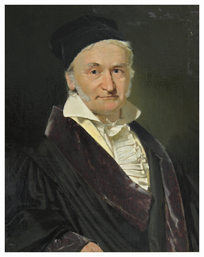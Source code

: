 \documentclass[]{article}
\begin{document}
\begin{figure}
  \centering
    \begin{subfigure}[t]{0.49\textwidth}
      \centering
      \includegraphics[width=1.\linewidth]{input2.png}
    \end{subfigure}
    \begin{subfigure}[t]{0.49\textwidth}
      \centering

\end{subfigure}
\end{figure}
\end{document}

